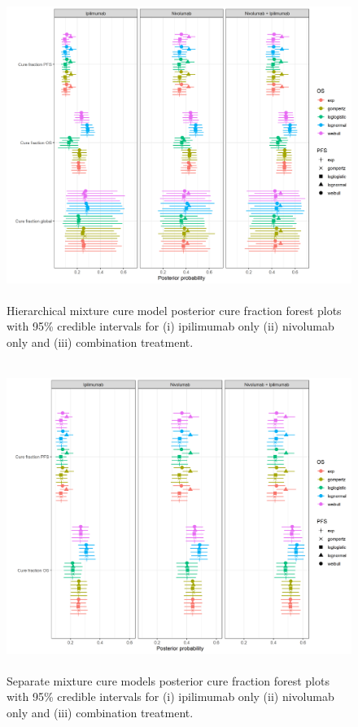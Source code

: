 \documentclass[AMA,STIX1COL]{WileyNJD-v2}
\begin{document}
\begin{figure}[hbt!]
\centering
\includegraphics[height=10cm, width=0.9\linewidth]{forest_plot_joint_cf_hier.png}
\caption{\label{fig:cf_forest_all_tx} Hierarchical mixture cure model posterior cure fraction forest plots with 95\% credible intervals for (i) ipilimumab only (ii) nivolumab only and (iii) combination treatment.}
\end{figure}

\begin{figure}[hbt!]
\centering
\includegraphics[height=10cm, width=0.9\linewidth]{forest_plot_joint_all_tx_separate.png}
\caption{\label{fig:cf_forest_all_tx_sep} Separate mixture cure models posterior cure fraction forest plots with 95\% credible intervals for (i) ipilimumab only (ii) nivolumab only and (iii) combination treatment.}
\end{figure}
\end{document}
